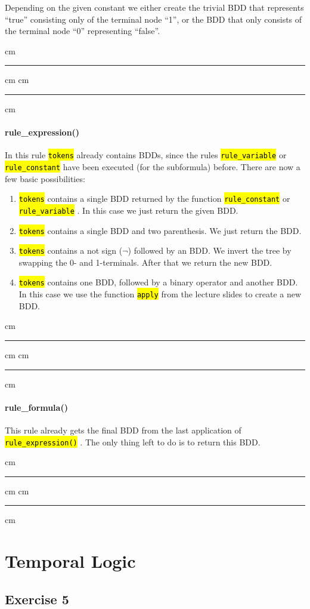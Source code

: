 \documentclass[a4paper, 11pt]{article}
\newcommand{\codeinput}[1]
{
    \vskip 0.3 cm
    {\color{lightgray}\hrule}\vskip 0.3 cm
    {\fontsize{9pt}{11pt}}
    \vskip 0.3 cm{\color{lightgray}\hrule}
    \vskip 0.3 cm
}
\newcommand{\code}[1]
{
    \hl{\texttt{#1}}
}
\begin{document}
Depending on the given constant we either create the trivial BDD that represents “true” consisting only of the terminal node “1”, or the BDD that only consists of the terminal node “0” representing “false”.

\codeinput{rule_constant}

\paragraph{rule\_expression()}

In this rule \code{tokens} already contains BDDs, since the rules \code{rule\_variable} or \code{rule\_constant} have been executed (for the subformula) before. There are now a few basic possibilities:

\begin{enumerate}
    \item \code{tokens} contains a single BDD returned by the function \code{rule\_constant} or \code{rule\_variable}. In this case we just return the given BDD.
    \item \code{tokens} contains a single BDD and two parenthesis. We just return the BDD.
    \item \code{tokens} contains a not sign ($¬$) followed by an BDD. We invert the tree by swapping the 0- and 1-terminals. After that we return the new BDD.
    \item \code{tokens} contains one BDD, followed by a binary operator and another BDD. In this case we use the function \code{apply} from the lecture slides to create a new BDD.
\end{enumerate}

\codeinput{rule_expression}

\paragraph{rule\_formula()}

This rule already gets the final BDD from the last application of \code{rule\_expression()}. The only thing left to do is to return this BDD.

\codeinput{rule_formula}

\newpage
\section{Temporal Logic}

\subsection{Exercise 5}
\end{document}

